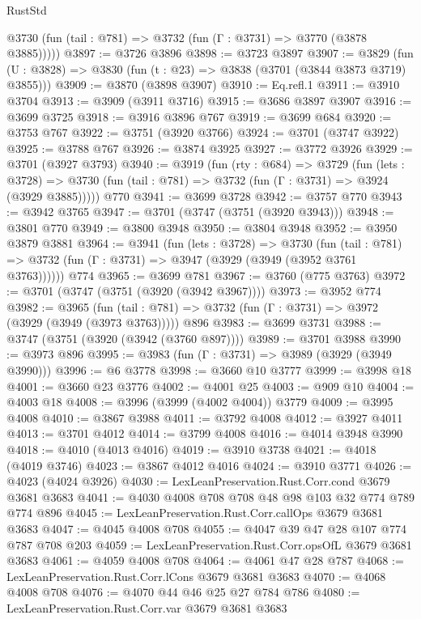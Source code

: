 \begin{lexlean}{RustStd}
\begin{coremodule}
      @3730 (fun (tail : @781) => @3732 (fun (Γ : @3731) => @3770 (@3878 @3885)))))
@3897 := @3726 @3896
@3898 := @3723 @3897
@3907 := @3829 (fun (U : @3828) => @3830 (fun (t : @23) => @3838 (@3701 (@3844 @3873 @3719) @3855)))
@3909 := @3870 (@3898 @3907)
@3910 := Eq.refl.{1}
@3911 := @3910 @3704
@3913 := @3909 (@3911 @3716)
@3915 := @3686 @3897 @3907
@3916 := @3699 @3725
@3918 := @3916 @3896 @767
@3919 := @3699 @684
@3920 := @3753 @767
@3922 := @3751 (@3920 @3766)
@3924 := @3701 (@3747 @3922)
@3925 := @3788 @767
@3926 := @3874 @3925
@3927 := @3772 @3926
@3929 := @3701 (@3927 @3793)
@3940 := @3919
    (fun (rty : @684) =>
    @3729
      (fun (lets : @3728) =>
      @3730 (fun (tail : @781) => @3732 (fun (Γ : @3731) => @3924 (@3929 @3885)))))
    @770
@3941 := @3699 @3728
@3942 := @3757 @770
@3943 := @3942 @3765
@3947 := @3701 (@3747 (@3751 (@3920 @3943)))
@3948 := @3801 @770
@3949 := @3800 @3948
@3950 := @3804 @3948
@3952 := @3950 @3879 @3881
@3964 := @3941
    (fun (lets : @3728) =>
    @3730
      (fun (tail : @781) => @3732 (fun (Γ : @3731) => @3947 (@3929 (@3949 (@3952 @3761 @3763))))))
    @774
@3965 := @3699 @781
@3967 := @3760 (@775 @3763)
@3972 := @3701 (@3747 (@3751 (@3920 (@3942 @3967))))
@3973 := @3952 @774
@3982 := @3965
    (fun (tail : @781) => @3732 (fun (Γ : @3731) => @3972 (@3929 (@3949 (@3973 @3763)))))
    @896
@3983 := @3699 @3731
@3988 := @3747 (@3751 (@3920 (@3942 (@3760 @897))))
@3989 := @3701 @3988
@3990 := @3973 @896
@3995 := @3983 (fun (Γ : @3731) => @3989 (@3929 (@3949 @3990)))
@3996 := @6 @3778
@3998 := @3660 @10 @3777
@3999 := @3998 @18
@4001 := @3660 @23 @3776
@4002 := @4001 @25
@4003 := @909 @10
@4004 := @4003 @18
@4008 := @3996 (@3999 (@4002 @4004)) @3779
@4009 := @3995 @4008
@4010 := @3867 @3988
@4011 := @3792 @4008
@4012 := @3927 @4011
@4013 := @3701 @4012
@4014 := @3799 @4008
@4016 := @4014 @3948 @3990
@4018 := @4010 (@4013 @4016)
@4019 := @3910 @3738
@4021 := @4018 (@4019 @3746)
@4023 := @3867 @4012 @4016
@4024 := @3910 @3771
@4026 := @4023 (@4024 @3926)
@4030 := LexLeanPreservation.Rust.Corr.cond @3679 @3681 @3683
@4041 := @4030 @4008 @708 @708 @48 @98 @103 @32 @774 @789 @774 @896
@4045 := LexLeanPreservation.Rust.Corr.callOps @3679 @3681 @3683
@4047 := @4045 @4008 @708
@4055 := @4047 @39 @47 @28 @107 @774 @787 @708 @203
@4059 := LexLeanPreservation.Rust.Corr.opsOfL @3679 @3681 @3683
@4061 := @4059 @4008 @708
@4064 := @4061 @47 @28 @787
@4068 := LexLeanPreservation.Rust.Corr.lCons @3679 @3681 @3683
@4070 := @4068 @4008 @708
@4076 := @4070 @44 @46 @25 @27 @784 @786
@4080 := LexLeanPreservation.Rust.Corr.var @3679 @3681 @3683

\end{coremodule}
\end{lexlean}
